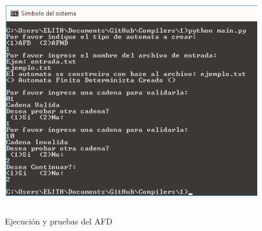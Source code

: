 	\begin{figure}[H]
		\begin{center}
			\includegraphics[width=15cm, height=10cm]{img/afd_salida.png}
			\caption{Ejecución y pruebas del AFD}
			\label{fig:tablas10}
		\end{center}
	\end{figure}
	\newpage

